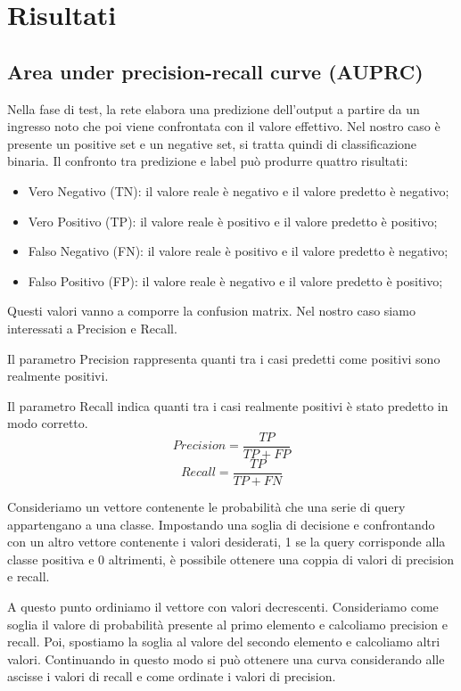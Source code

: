 \documentclass[12pt,a4paper,titlepage]{article}
\begin{document}
\clearpage

\section{Risultati}
\subsection{Area under precision-recall curve (AUPRC)}
Nella fase di test, la rete elabora una predizione dell'output a partire da un ingresso noto che poi viene confrontata con il valore effettivo.
Nel nostro caso è presente un positive set e un negative set, si tratta quindi di classificazione binaria.
Il confronto tra predizione e label può produrre quattro risultati:
\begin{itemize}
	\item Vero Negativo (TN): il valore reale è negativo e il valore predetto è negativo;
	\item Vero Positivo (TP): il valore reale è positivo e il valore predetto	è positivo;
	\item Falso Negativo (FN): il valore reale è positivo e il valore predetto è negativo;
	\item Falso Positivo (FP): il valore reale è negativo e il valore predetto	è positivo;
\end{itemize}
Questi valori vanno a comporre la confusion matrix.
Nel nostro caso siamo interessati a Precision e Recall.

Il parametro Precision rappresenta quanti tra i casi predetti come positivi sono realmente positivi.

Il parametro Recall indica quanti tra i casi realmente positivi è stato predetto in modo corretto.
\begin{equation}
Precision=\frac{TP}{TP+FP}
\end{equation}
\begin{equation}
Recall=\frac{TP}{TP+FN}
\end{equation}

Consideriamo un vettore contenente le probabilità che una serie di query appartengano a una classe. Impostando una soglia di decisione e confrontando con un altro vettore contenente i valori desiderati, 1 se la query corrisponde alla classe positiva e 0 altrimenti, è possibile ottenere una coppia di valori di precision e recall.

A questo punto ordiniamo il vettore con valori decrescenti.
Consideriamo come soglia il valore di probabilità presente al primo elemento e calcoliamo precision e recall.
Poi, spostiamo la soglia al valore del secondo elemento e calcoliamo altri valori.
Continuando in questo modo si può ottenere una curva considerando alle ascisse i valori di recall e come ordinate i valori di precision.
\end{document}
